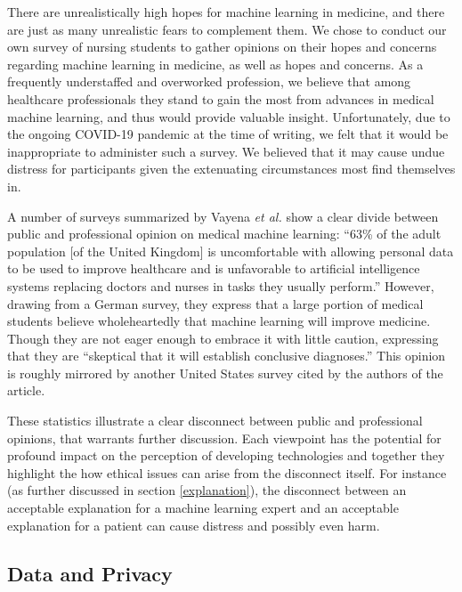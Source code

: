 \documentclass[]{article}
\begin{document}
		There are unrealistically high hopes for machine learning in medicine\cite{Chen2017,10.1001/jama.2017.18391}, and there are just as many unrealistic fears to complement them\cite{bbc2016rroai}. We chose to conduct our own survey of nursing students to gather opinions on  their hopes and concerns regarding machine learning in medicine, as well as hopes and concerns. As a frequently understaffed and overworked profession\cite{doi:10.1111/j.1365-2648.2009.05082.x}, we believe that among healthcare professionals they stand to gain the most from advances in medical machine learning, and thus would provide valuable insight. Unfortunately, due to the ongoing COVID-19 pandemic at the time of writing, we felt that it would be inappropriate to administer such a survey. We believed that it may cause undue distress for participants given the extenuating circumstances most find themselves in.

		A number of surveys summarized by Vayena \emph{et al.} show a clear divide between public and professional opinion on medical machine learning: ``63\% of the adult population [of the United Kingdom] is uncomfortable with allowing personal data to be used to improve healthcare and is unfavorable to artificial intelligence systems replacing doctors and nurses in tasks they usually perform.'' However, drawing from a German survey, they express that a large portion of medical students believe wholeheartedly that machine learning will improve medicine. Though they are not eager enough to embrace it with little caution, expressing that they are ``skeptical that it will establish conclusive diagnoses.''\cite{Vayena2018} This opinion is roughly mirrored by another United States survey cited by the authors of the article.\cite{PintodosSantos2019}
		
		These statistics illustrate a clear disconnect between public and professional opinions, that warrants further discussion. Each viewpoint has the potential for profound impact on the perception of developing technologies and together they highlight the how ethical issues can arise from the disconnect itself. For instance (as further discussed in section \ref{explanation}), the disconnect between an acceptable explanation for a machine learning expert and an acceptable explanation for a patient can cause distress and possibly even harm.

		\subsection{Data and Privacy}
\end{document}
